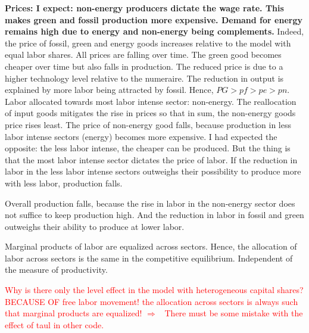 \documentclass[12pt]{article}
\newcommand{\ar}{$\Rightarrow$ \ }
\newcommand{\tr}[1]{\textcolor{red}{#1}}
\begin{document}
\textbf{Prices: I expect: non-energy producers dictate the wage rate. This makes green and fossil production more expensive. Demand for energy remains high due to energy and non-energy being complements. } Indeed, the price of fossil, green and energy goods increases relative to the model with equal labor shares. All prices are falling over time. 
The green good becomes cheaper over time but also falls in production. 
The reduced price is due to a higher technology level relative to the numeraire. The reduction in output is explained by more labor being attracted by fossil. 
 Hence, $PG> pf>pe> pn$. Labor allocated towards most labor intense sector: non-energy. The reallocation of input goods mitigates the rise in prices so that in sum, the non-energy goods price rises least. 
 The price of non-energy good falls, because production in less labor intense sectors (energy) becomes more expensive. I had expected the opposite: the less labor intense, the cheaper can be produced.  But the thing is that the most labor intense sector dictates the price of labor. If the reduction in labor in the less labor intense sectors outweighs their possibility to produce more with less labor, production falls. 
 
 Overall production falls, because the rise in labor in the non-energy sector does not suffice to keep production high. And the reduction in labor in fossil and green outweighs their ability to produce at lower labor. 

Marginal products of labor are equalized across sectors. Hence, the allocation of labor across sectors is the same in the competitive equilibrium. Independent of  the measure of productivity. 

\tr{Why is there only the level effect in the model with heterogeneous capital shares?
	BECAUSE OF free labor movement! the allocation across sectors is always such that marginal products are equalized! \ar There must be some mistake with the effect of taul in other code. 
}
\end{document}
